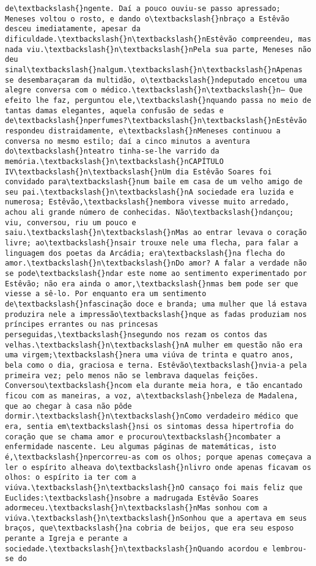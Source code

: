 \begin{Verbatim}[commandchars=\\\{\}]
de\textbackslash{}ngente. Daí a pouco ouviu-se passo apressado; Meneses voltou o rosto, e dando o\textbackslash{}nbraço a Estêvão desceu imediatamente, apesar da dificuldade.\textbackslash{}n\textbackslash{}nEstêvão compreendeu, mas nada viu.\textbackslash{}n\textbackslash{}nPela sua parte, Meneses não deu sinal\textbackslash{}nalgum.\textbackslash{}n\textbackslash{}nApenas se desembaraçaram da multidão, o\textbackslash{}ndeputado encetou uma alegre conversa com o médico.\textbackslash{}n\textbackslash{}n— Que efeito lhe faz, perguntou ele,\textbackslash{}nquando passa no meio de tantas damas elegantes, aquela confusão de sedas e de\textbackslash{}nperfumes?\textbackslash{}n\textbackslash{}nEstêvão respondeu distraidamente, e\textbackslash{}nMeneses continuou a conversa no mesmo estilo; daí a cinco minutos a aventura do\textbackslash{}nteatro tinha-se-lhe varrido da memória.\textbackslash{}n\textbackslash{}nCAPÍTULO IV\textbackslash{}n\textbackslash{}nUm dia Estêvão Soares foi convidado para\textbackslash{}num baile em casa de um velho amigo de seu pai.\textbackslash{}n\textbackslash{}nA sociedade era luzida e numerosa; Estêvão,\textbackslash{}nembora vivesse muito arredado, achou ali grande número de conhecidas. Não\textbackslash{}ndançou; viu, conversou, riu um pouco e saiu.\textbackslash{}n\textbackslash{}nMas ao entrar levava o coração livre; ao\textbackslash{}nsair trouxe nele uma flecha, para falar a linguagem dos poetas da Arcádia; era\textbackslash{}na flecha do amor.\textbackslash{}n\textbackslash{}nDo amor? A falar a verdade não se pode\textbackslash{}ndar este nome ao sentimento experimentado por Estêvão; não era ainda o amor,\textbackslash{}nmas bem pode ser que viesse a sê-lo. Por enquanto era um sentimento de\textbackslash{}nfascinação doce e branda; uma mulher que lá estava produzira nele a impressão\textbackslash{}nque as fadas produziam nos príncipes errantes ou nas princesas perseguidas,\textbackslash{}nsegundo nos rezam os contos das velhas.\textbackslash{}n\textbackslash{}nA mulher em questão não era uma virgem;\textbackslash{}nera uma viúva de trinta e quatro anos, bela como o dia, graciosa e terna. Estêvão\textbackslash{}nvia-a pela primeira vez; pelo menos não se lembrava daquelas feições. Conversou\textbackslash{}ncom ela durante meia hora, e tão encantado ficou com as maneiras, a voz, a\textbackslash{}nbeleza de Madalena, que ao chegar à casa não pôde dormir.\textbackslash{}n\textbackslash{}nComo verdadeiro médico que era, sentia em\textbackslash{}nsi os sintomas dessa hipertrofia do coração que se chama amor e procurou\textbackslash{}ncombater a enfermidade nascente. Leu algumas páginas de matemáticas, isto é,\textbackslash{}npercorreu-as com os olhos; porque apenas começava a ler o espírito alheava do\textbackslash{}nlivro onde apenas ficavam os olhos: o espírito ia ter com a viúva.\textbackslash{}n\textbackslash{}nO cansaço foi mais feliz que Euclides:\textbackslash{}nsobre a madrugada Estêvão Soares adormeceu.\textbackslash{}n\textbackslash{}nMas sonhou com a viúva.\textbackslash{}n\textbackslash{}nSonhou que a apertava em seus braços, que\textbackslash{}na cobria de beijos, que era seu esposo perante a Igreja e perante a sociedade.\textbackslash{}n\textbackslash{}nQuando acordou e lembrou-se do 
\end{Verbatim}
